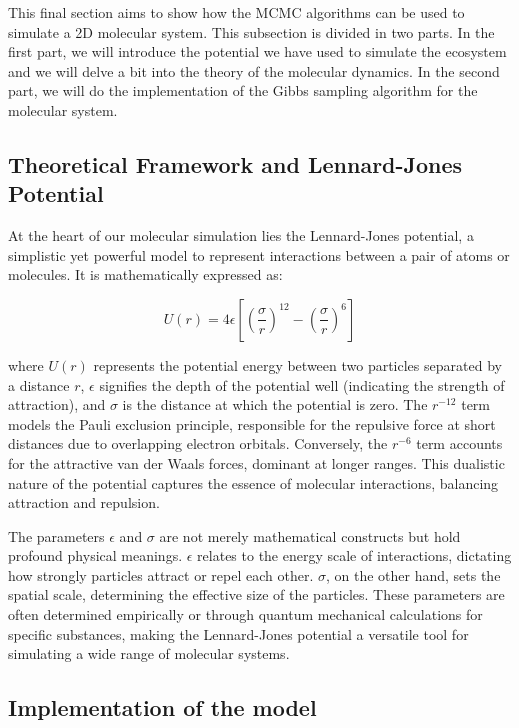 \documentclass{report}
\begin{document}
This final section aims to show how the MCMC algorithms can be used to simulate a 2D molecular system. This subsection is divided in two parts. In the first part, we will introduce the potential we have used to simulate the ecosystem and we will delve a bit into the theory of the molecular dynamics. In the second part, we will do the implementation of the Gibbs sampling algorithm for the molecular system.

\subsection{Theoretical Framework and Lennard-Jones Potential}
\label{sec:lennard_jones_potential}

At the heart of our molecular simulation lies the Lennard-Jones potential, a simplistic yet powerful model to represent interactions between a pair of atoms or molecules. It is mathematically expressed as:

\[
	U(r) = 4\epsilon \left[ \left( \frac{\sigma}{r} \right)^{12} - \left( \frac{\sigma}{r} \right)^6 \right]
\]

where \( U(r) \) represents the potential energy between two particles separated by a distance \( r \), \( \epsilon \) signifies the depth of the potential well (indicating the strength of attraction), and \( \sigma \) is the distance at which the potential is zero. The \( r^{-12} \) term models the Pauli exclusion principle, responsible for the repulsive force at short distances due to overlapping electron orbitals. Conversely, the \( r^{-6} \) term accounts for the attractive van der Waals forces, dominant at longer ranges. This dualistic nature of the potential captures the essence of molecular interactions, balancing attraction and repulsion.

The parameters \( \epsilon \) and \( \sigma \) are not merely mathematical constructs but hold profound physical meanings. \( \epsilon \) relates to the energy scale of interactions, dictating how strongly particles attract or repel each other. \( \sigma \), on the other hand, sets the spatial scale, determining the effective size of the particles. These parameters are often determined empirically or through quantum mechanical calculations for specific substances, making the Lennard-Jones potential a versatile tool for simulating a wide range of molecular systems.

\subsection{Implementation of the model}
\label{sec:metropolis_hastings_implementation}
\end{document}
